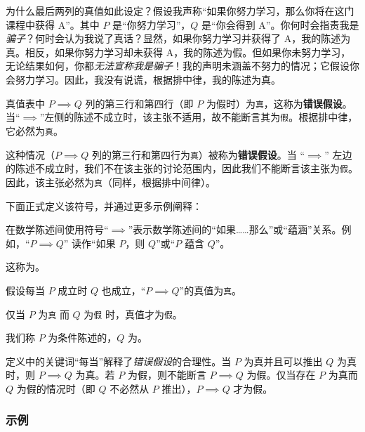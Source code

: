 为什么最后两列的真值如此设定？假设我声称``如果你努力学习，那么你将在这门课程中获得 A''。其中 $P$ 是``你努力学习''，$Q$ 是``你会得到 A''。你何时会指责我是\emph{骗子}？何时会认为我说了真话？显然，如果你努力学习并获得了 A，我的陈述为真。相反，如果你努力学习却未获得 A，我的陈述为假。但如果你未努力学习，无论结果如何，你都\emph{无法宣称我是骗子}！我的声明未涵盖不努力的情况；它假设你会努力学习。因此，我没有说谎，根据排中律，我的陈述为真。

真值表中 $P \implies Q$ 列的第三行和第四行（即 $P$ 为假时）为\verb|真|，这称为\textbf{错误假设}。当``$\implies$''左侧的陈述不成立时，该主张不适用，故不能断言其为\verb|假|。根据排中律，它必然为\verb|真|。

这种情况（$P \implies Q$ 列的第三行和第四行为\verb|真|）被称为\textbf{错误假设}。当 ``$\implies$'' 左边的陈述不成立时，我们不在该主张的讨论范围内，因此我们不能断言该主张为\verb|假|。因此，该主张必然为\verb|真|（同样，根据排中间律）。

下面正式定义该符号，并通过更多示例阐释：

\begin{definition}
    在数学陈述间使用符号``$\implies$''表示数学陈述间的``如果……那么''或``蕴涵''关系。例如，``$P \implies Q$'' 读作``如果 $P$，则 $Q$''或``$P$ 蕴含 $Q$''。

    这称为。

    假设每当 $P$ 成立时 $Q$ 也成立，``$P \implies Q$''的真值为\verb|真|。

    仅当 $P$ 为\verb|真| 而 $Q$ 为\verb|假| 时，真值才为\verb|假|。

    我们称  $P$ 为条件陈述的，$Q$ 为。
\end{definition}

定义中的关键词``每当''解释了\emph{错误假设}的合理性。当 $P$ 为真并且可以推出 $Q$ 为真时，则 $P \implies Q$ 为真。若 $P$ 为假，则不能断言 $P \implies Q$ 为假。仅当存在 $P$ 为真而 $Q$ 为假的情况时（即 $Q$ 不必然从 $P$ 推出），$P \implies Q$ 才为假。

\subsubsection*{示例}

